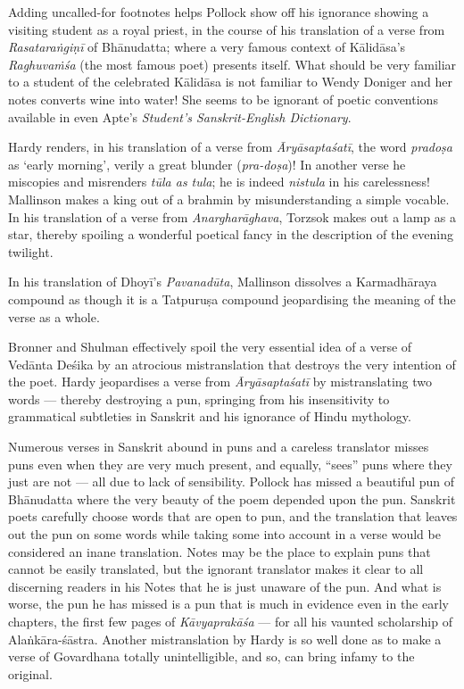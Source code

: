 Adding uncalled-for footnotes helps Pollock show off his ignorance showing a visiting student as a royal priest, in the course of his translation of a verse from \textsl{Rasataraṅgiṇī} of Bhānudatta; where a very famous context of Kālidāsa’s \textsl{Raghuvaṁśa} (the most famous poet) presents itself. What should be very familiar to a student of the celebrated Kālidāsa is not familiar to Wendy Doniger and her notes converts wine into water! She seems to be ignorant of poetic conventions available in even Apte’s \textsl{Student’s Sanskrit-English Dictionary}.

Hardy renders, in his translation of a verse from \textsl{Āryāsaptaśatī}, the word \textsl{pradoṣa} as ‘early morning’, verily a great blunder (\textsl{pra-doṣa})! In another verse he miscopies and misrenders \textsl{tūla as tula}; he is indeed \textsl{nistula} in his carelessness! Mallinson makes a king out of a brahmin by misunderstanding a simple vocable. In his translation of a verse from \textsl{Anargharāghava}, Torzsok makes out a lamp as a star, thereby spoiling a wonderful poetical fancy in the description of the evening twilight.

In his translation of Dhoyī’s \textsl{Pavanadūta}, Mallinson dissolves a Karmadhāraya compound as though it is a Tatpuruṣa compound jeopardising the meaning of the verse as a whole.

Bronner and Shulman effectively spoil the very essential idea of a verse of Vedānta Deśika by an atrocious mistranslation that destroys the very intention of the poet. Hardy jeopardises a verse from \textsl{Āryāsaptaśatī} by mistranslating two words --- thereby destroying a pun, springing from his insensitivity to grammatical subtleties in Sanskrit and his ignorance of Hindu mythology.

Numerous verses in Sanskrit abound in puns and a careless translator misses puns even when they are very much present, and equally, “sees” puns where they just are not --- all due to lack of sensibility. Pollock has missed a beautiful pun of Bhānudatta where the very beauty of the poem depended upon the pun. Sanskrit poets carefully choose words that are open to pun, and the translation that leaves out the pun on some words while taking some into account in a verse would be considered an inane translation. Notes may be the place to explain puns that cannot be easily translated, but the ignorant translator makes it clear to all discerning readers in his Notes that he is just unaware of the pun. And what is worse, the pun he has missed is a pun that is much in evidence even in the early chapters, the first few pages of \textsl{Kāvyaprakāśa} --- for all his vaunted scholarship of Alaṅkāra-śāstra. Another mistranslation by Hardy is so well done as to make a verse of Govardhana totally unintelligible, and so, can bring infamy to the original.

